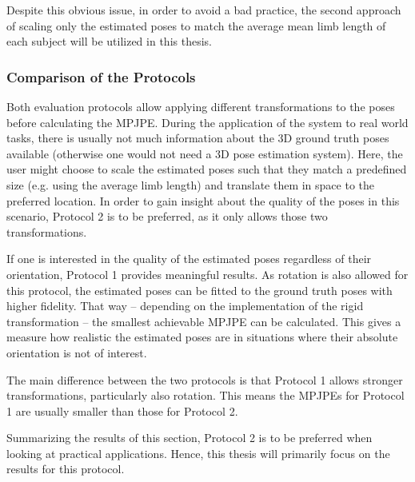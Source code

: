 Despite this obvious issue, in order to avoid a bad practice, the second approach of scaling only the estimated poses to match the average mean limb length of each subject will be utilized in this thesis.

\subsubsection{Comparison of the Protocols}

Both evaluation protocols allow applying different transformations to the poses before calculating the MPJPE.
During the application of the system to real world tasks, there is usually not much information about the 3D ground truth poses available (otherwise one would not need a 3D pose estimation system).
Here, the user might choose to scale the estimated poses such that they match a predefined size (e.g. using the average limb length) and translate them in space to the preferred location.
In order to gain insight about the quality of the poses in this scenario, Protocol 2 is to be preferred, as it only allows those two transformations.

If one is interested in the quality of the estimated poses regardless of their orientation, Protocol 1 provides meaningful results.
As rotation is also allowed for this protocol, the estimated poses can be fitted to the ground truth poses with higher fidelity.
That way -- depending on the implementation of the rigid transformation -- the smallest achievable MPJPE can be calculated.
This gives a measure how realistic the estimated poses are in situations where their absolute orientation is not of interest.

The main difference between the two protocols is that Protocol 1 allows stronger transformations, particularly also rotation.
This means the MPJPEs for Protocol 1 are usually smaller than those for Protocol 2.

Summarizing the results of this section, Protocol 2 is to be preferred when looking at practical applications.
Hence, this thesis will primarily focus on the results for this protocol.
